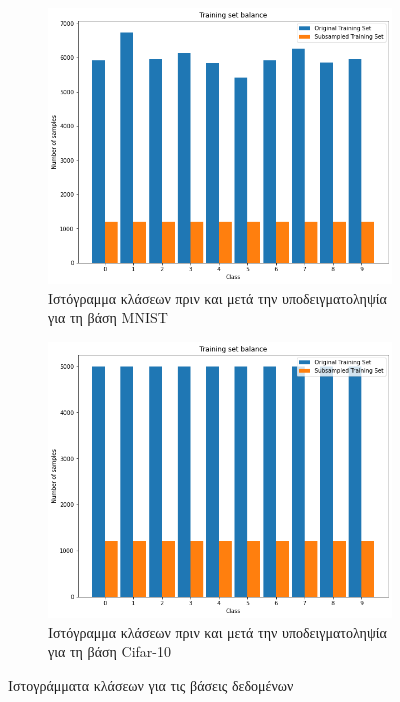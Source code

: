 \documentclass[a4paper]{article}
\begin{document}
\begin{figure}[H]
    \centering

    \begin{subfigure}[t]{0.48\linewidth}
    \includegraphics[width=\linewidth]{mnist/training_freq.png}
    \caption{Ιστόγραμμα κλάσεων πριν και μετά την υποδειγματοληψία για τη βάση
    MNIST}
    \label{fig:hist1}
    \end{subfigure}
    \begin{subfigure}[t]{0.48\linewidth}
    \includegraphics[width=\linewidth]{cifar/training_freq.png}
    \caption{Ιστόγραμμα κλάσεων πριν και μετά την υποδειγματοληψία για τη βάση
        Cifar-10}
    \end{subfigure}

    \caption{Ιστογράμματα κλάσεων για τις βάσεις δεδομένων}
    \label{fig:hist}
\end{figure}
\end{document}
